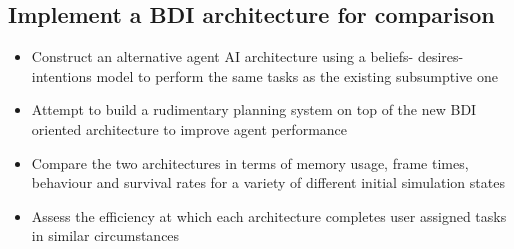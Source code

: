 \documentclass[a4paper,11pt]{article}
\begin{document}
\subsection{Implement a BDI architecture for comparison}
    \begin{itemize}
    \item Construct an alternative agent AI architecture using a beliefs-
        desires-intentions model to perform the same tasks as the existing
        subsumptive one
    \item Attempt to build a rudimentary planning system on top of the new
        BDI oriented architecture to improve agent performance
    \item Compare the two architectures in terms of memory usage, frame
        times, behaviour and survival rates for a variety of different
        initial simulation states
    \item Assess the efficiency at which each architecture completes user
        assigned tasks in similar circumstances
    \end{itemize}
\end{document}
